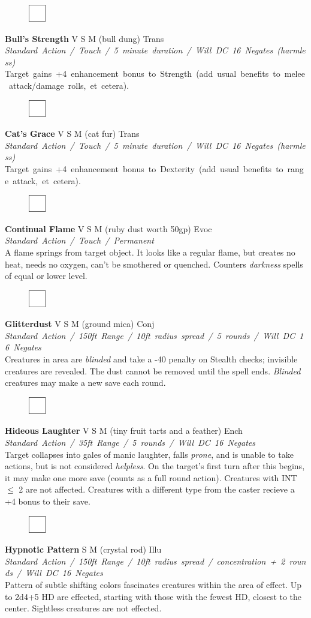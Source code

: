 \documentclass[letterpaper]{article}
\newcommand{\spell}[7]{
\begin{figure}
\vspace{-13pt}
\ifstrequal{#2}{Full}{\includegraphics[width=2em]{Checkbox-Full}}{
                      \includegraphics[width=2em]{Checkbox}}
\ifstrequal{#7}{}{\vspace{-1em}}{\vspace{#7}}
\end{figure}
\noindent \textbf{#1} #3 {
    \ifstrequal{#4}{Conj}{\color{Plum}Conj}{%
    \ifstrequal{#4}{Divin}{\color{YellowOrange}Divin}{%
    \ifstrequal{#4}{Ench}{\color{VioletRed}Ench}{%
    \ifstrequal{#4}{Trans}{\color{LimeGreen}Trans}{%
    \ifstrequal{#4}{Evoc}{\color{RedOrange}Evoc}{%
    \ifstrequal{#4}{Illu}{\color{ProcessBlue}Illu}{%
    \ifstrequal{#4}{Abjur}{\color{CadetBlue}Abjur}{%
    \ifstrequal{#4}{Necro}{\color{Red}Necro}{%
}}}}}}}}}
{\footnotesize \emph{#5}} \\
#6
}
\begin{document}
\spell{Bull's Strength}{}{V S M (bull dung)}{Trans}{\mbox{Standard Action / Touch / 5 minute duration / Will DC 16 Negates (harmless)}}{%
\mbox{Target gains +4 enhancement bonus to Strength (add usual benefits to melee attack/damage rolls, et cetera).} }{}\\[-1em] %

\spell{Cat's Grace}{}{V S M (cat fur)}{Trans}{\mbox{Standard Action / Touch / 5 minute duration / Will DC 16 Negates (harmless)}}{%
\mbox{Target gains +4 enhancement bonus to Dexterity (add usual benefits to range attack, et cetera).} }{}\\[-1em] %

\spell{Continual Flame}{}{V S M (ruby dust worth 50gp)}{Evoc}{\mbox{Standard Action / Touch / Permanent}}{%
A flame springs from target object.  It looks like a regular flame, but creates no heat, needs no oxygen, can't be smothered or quenched.  Counters \emph{darkness} spells of equal or lower level.}{}

\spell{Glitterdust}{}{V S M (ground mica)}{Conj}{\mbox{Standard Action / 150ft Range / 10ft radius spread / 5 rounds / Will DC 16 Negates }}{%
Creatures in area are \emph{blinded} and take a -40 penalty on Stealth checks; invisible creatures are revealed. The dust cannot be removed until the spell ends. \emph{Blinded} creatures may make a new save each round.}{} %

\spell{Hideous Laughter}{}{V S M (tiny fruit tarts and a feather)}{Ench}{\mbox{Standard Action / 35ft Range / 5 rounds / Will DC 16 Negates }}{%
Target collapses into gales of manic laughter, falls \emph{prone}, and is unable to take actions, but is not considered \emph{helpless}. On the target's first turn after this begins, it may make one more save (counts as a full round action).  Creatures with INT $\leq$ 2 are not affected.  Creatures with a different type from the caster recieve a +4 bonus to their save.}{0em} %

\spell{Hypnotic Pattern}{}{S M (crystal rod)}{Illu}{\mbox{Standard Action / 150ft Range / 10ft radius spread / concentration + 2 rounds / Will DC 16 Negates }}{%
Pattern of subtle shifting colors fascinates creatures within the area of effect.  Up to 2d4+5 HD are effected, starting with those with the fewest HD, closest to the center.  Sightless creatures are not effected.}{} %
\end{document}

